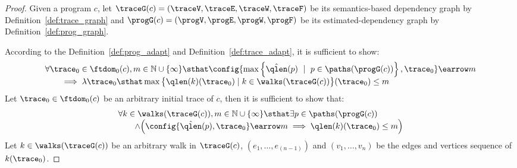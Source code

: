 \begin{proof}
Given a program ${c}$, let $\traceG({c}) = (\traceV, \traceE, \traceW, \traceF)$ 
be its semantics-based dependency graph by Definition~\ref{def:trace_graph} and $\progG({c}) = (\progV, \progE, \progW, \progF)$ be its estimated-dependency graph
by Definition~\ref{def:prog_graph}.
%

According to the Definition~\ref{def:prog_adapt} and Definition~\ref{def:trace_adapt}, it is sufficient to show:
%
\[
	\begin{array}{l}
		\forall \trace_0 \in \ftdom_{0}(c), m \in \mathbb{N} \cup \{\infty\} \sthat
\config{\max \left\{ \hat{\qlen}(p) \ \mid \  p \in \paths(\progG(c))\right \}
, \trace_0 } \earrow m 
\\ \qquad 
\implies 
\lambda \trace_0 \sthat 
\max \big \{ \qlen(k)(\trace_0) \mid k \in \walks(\traceG(c)) \big \} (\trace_0)
\leq m
\end{array}
\]
%
%
Let $\trace_0 \in \ftdom_0(c)$ be an arbitrary initial trace of $c$,
then it is sufficient to show that:
\[
	\begin{array}{l}
\forall 
  k \in \walks(\traceG(c)), 
  m \in \mathbb{N} \cup \{\infty\}
  \sthat
  \exists p \in \paths(\progG(c)) 
  \\ \qquad 
  \land
 \Big( \config{\hat{\qlen}(p), \trace_0} \earrow m
   \implies 
  \qlen(k)(\trace_0) \leq m
  \Big)
\end{array}
\]
%
Let $k\in \walks(\traceG(c))$ be an arbitrary walk in $\traceG(c)$,
 $(e_{1}, \ldots, e_{(n-1)}) $ and
$(v_1, \ldots, v_n)$ be the edges and vertices sequence of $k(\trace_0)$.


\end{proof}
